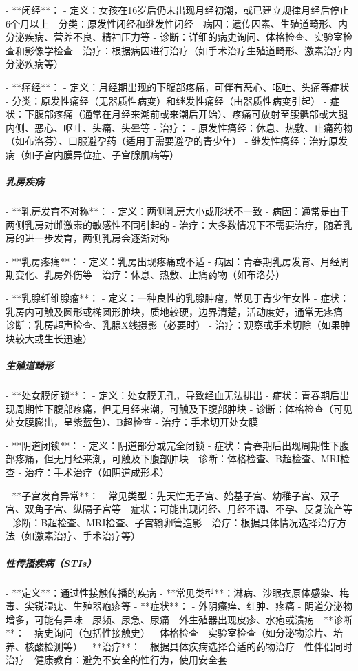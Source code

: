 \begin{enumerate}
- **闭经**：
  - 定义：女孩在16岁后仍未出现月经初潮，或已建立规律月经后停止6个月以上
  - 分类：原发性闭经和继发性闭经
  - 病因：遗传因素、生殖道畸形、内分泌疾病、营养不良、精神压力等
  - 诊断：详细的病史询问、体格检查、实验室检查和影像学检查
  - 治疗：根据病因进行治疗（如手术治疗生殖道畸形、激素治疗内分泌疾病等）

- **痛经**：
  - 定义：月经期出现的下腹部疼痛，可伴有恶心、呕吐、头痛等症状
  - 分类：原发性痛经（无器质性病变）和继发性痛经（由器质性病变引起）
  - 症状：下腹部疼痛（通常在月经来潮前或来潮后开始）、疼痛可放射至腰骶部或大腿内侧、恶心、呕吐、头痛、头晕等
  - 治疗：
    - 原发性痛经：休息、热敷、止痛药物（如布洛芬）、口服避孕药（适用于需要避孕的青少年）
    - 继发性痛经：治疗原发病（如子宫内膜异位症、子宫腺肌病等）

\subparagraph{乳房疾病}

- **乳房发育不对称**：
  - 定义：两侧乳房大小或形状不一致
  - 病因：通常是由于两侧乳房对雌激素的敏感性不同引起的
  - 治疗：大多数情况下不需要治疗，随着乳房的进一步发育，两侧乳房会逐渐对称

- **乳房疼痛**：
  - 定义：乳房出现疼痛或不适
  - 病因：青春期乳房发育、月经周期变化、乳房外伤等
  - 治疗：休息、热敷、止痛药物（如布洛芬）

- **乳腺纤维腺瘤**：
  - 定义：一种良性的乳腺肿瘤，常见于青少年女性
  - 症状：乳房内可触及圆形或椭圆形肿块，质地较硬，边界清楚，活动度好，通常无疼痛
  - 诊断：乳房超声检查、乳腺X线摄影（必要时）
  - 治疗：观察或手术切除（如果肿块较大或生长迅速）

\subparagraph{生殖道畸形}

- **处女膜闭锁**：
  - 定义：处女膜无孔，导致经血无法排出
  - 症状：青春期后出现周期性下腹部疼痛，但无月经来潮，可触及下腹部肿块
  - 诊断：体格检查（可见处女膜膨出，呈紫蓝色）、B超检查
  - 治疗：手术切开处女膜

- **阴道闭锁**：
  - 定义：阴道部分或完全闭锁
  - 症状：青春期后出现周期性下腹部疼痛，但无月经来潮，可触及下腹部肿块
  - 诊断：体格检查、B超检查、MRI检查
  - 治疗：手术治疗（如阴道成形术）

- **子宫发育异常**：
  - 常见类型：先天性无子宫、始基子宫、幼稚子宫、双子宫、双角子宫、纵隔子宫等
  - 症状：可能出现闭经、月经不调、不孕、反复流产等
  - 诊断：B超检查、MRI检查、子宫输卵管造影
  - 治疗：根据具体情况选择治疗方法（如激素治疗、手术治疗等）

\subparagraph{性传播疾病（STIs）}

- **定义**：通过性接触传播的疾病
- **常见类型**：淋病、沙眼衣原体感染、梅毒、尖锐湿疣、生殖器疱疹等
- **症状**：
  - 外阴瘙痒、红肿、疼痛
  - 阴道分泌物增多，可能有异味
  - 尿频、尿急、尿痛
  - 外生殖器出现皮疹、水疱或溃疡
- **诊断**：
  - 病史询问（包括性接触史）
  - 体格检查
  - 实验室检查（如分泌物涂片、培养、核酸检测等）
- **治疗**：
  - 根据具体疾病选择合适的药物治疗
  - 性伴侣同时治疗
  - 健康教育：避免不安全的性行为，使用安全套


\end{enumerate}
